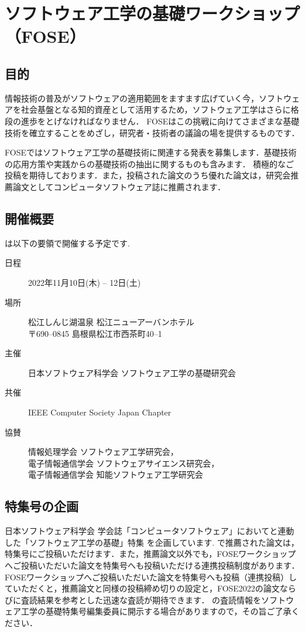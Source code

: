 \documentclass[T,J]{fose} %
\begin{document}
\section{ソフトウェア工学の基礎ワークショップ（FOSE）}
\subsection{目的}
情報技術の普及がソフトウェアの適用範囲をますます広げていく今，ソフトウェアを社会基盤となる知的資産として活用するため，ソフトウェア工学はさらに格段の進歩をとげなければなりません．
FOSEはこの挑戦に向けてさまざまな基礎技術を確立することをめざし，研究者・技術者の議論の場を提供するものです．

FOSEではソフトウェア工学の基礎技術に関連する発表を募集します．基礎技術の応用方策や実践からの基礎技術の抽出に関するものも含みます．
積極的なご投稿を期待しております．また，投稿された論文のうち優れた論文は，研究会推薦論文としてコンピュータソフトウェア誌に推薦されます．

\subsection{開催概要}
\foseabbrev\cite{fose2023}は以下の要領で開催する予定です.
\begin{description}
\item[日程] 2022年11月10日(木) -- 12日(土)
\item[場所] 松江しんじ湖温泉 松江ニューアーバンホテル\\
{\footnotesize
   〒690--0845 島根県松江市西茶町40--1
}
\item[主催] 日本ソフトウェア科学会 ソフトウェア工学の基礎研究会
\item[共催] IEEE Computer Society Japan Chapter
\item[協賛] 情報処理学会 ソフトウェア工学研究会，\\
	電子情報通信学会 ソフトウェアサイエンス研究会，\\
	電子情報通信学会 知能ソフトウェア工学研究会
\end{description}

\subsection{特集号の企画}
日本ソフトウェア科学会 学会誌「コンピュータソフトウェア」において{\foseabbrev}と連動した「ソフトウェア工学の基礎」特集 を企画しています.
{\foseabbrev}で推薦された論文は，特集号にご投稿いただけます．また，推薦論文以外でも，FOSEワークショップへご投稿いただいた論文を特集号へも投稿いただける連携投稿制度があります．
FOSEワークショップへご投稿いただいた論文を特集号へも投稿（連携投稿）していただくと，推薦論文と同様の投稿締め切りの設定と，FOSE2022の論文ならびに査読結果を参考とした迅速な査読が期待できます．
{\foseabbrev}の査読情報をソフトウェア工学の基礎特集号編集委員に開示する場合がありますので，その旨ご了承ください．
\end{document}
